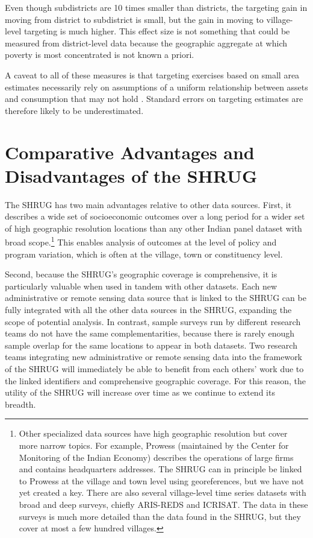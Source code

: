 \documentclass[12pt,letterpaper]{article}
\begin{document}
Even though subdistricts are 10 times smaller than districts, the targeting gain in moving from district to subdistrict is small, but the gain in moving to village-level targeting is much higher. This effect size is not something that could be measured from district-level data because the geographic aggregate at which poverty is most concentrated is not known a priori.

A caveat to all of these measures is that targeting exercises based on
small area estimates necessarily rely on assumptions of a uniform
relationship between assets and consumption that may not hold
\cite{tarozzi2009}. Standard errors on targeting estimates are
therefore likely to be underestimated.

\section{Comparative Advantages and Disadvantages of the SHRUG}
\label{sec:strengths}

The SHRUG has two main advantages relative to other data sources. First, it describes a wide set of socioeconomic outcomes over a long period for a wider set of high geographic resolution locations than any other Indian panel dataset with broad scope.\footnote{Other specialized data sources have high geographic resolution but cover more narrow topics. For example, Prowess (maintained by the Center for Monitoring of the Indian Economy) describes the operations of large firms and contains headquarters addresses. The SHRUG can in principle be linked to Prowess at the village and town level using georeferences, but we have not yet created a key. There are also several village-level time series datasets with broad and deep surveys, chiefly ARIS-REDS and ICRISAT. The data in these surveys is much more detailed than the data found in the SHRUG, but they cover at most a few hundred villages.} This enables analysis of outcomes at the level of policy and program variation, which is often at the village, town or constituency level.

Second, because the SHRUG's geographic coverage is comprehensive, it is particularly valuable when used in tandem with other datasets. Each new administrative or remote sensing data source that is linked to the SHRUG can be fully integrated with all the other data sources in the SHRUG, expanding the scope of potential analysis. In contrast, sample surveys run by different research teams do not have the same complementarities, because there is rarely enough sample overlap for the same locations to appear in both datasets. Two research teams integrating new administrative or remote sensing data into the framework of the SHRUG will immediately be able to benefit from each others' work due to the linked identifiers and comprehensive geographic coverage. For this reason, the utility of the SHRUG will increase over time as we continue to extend its breadth.
\end{document}
